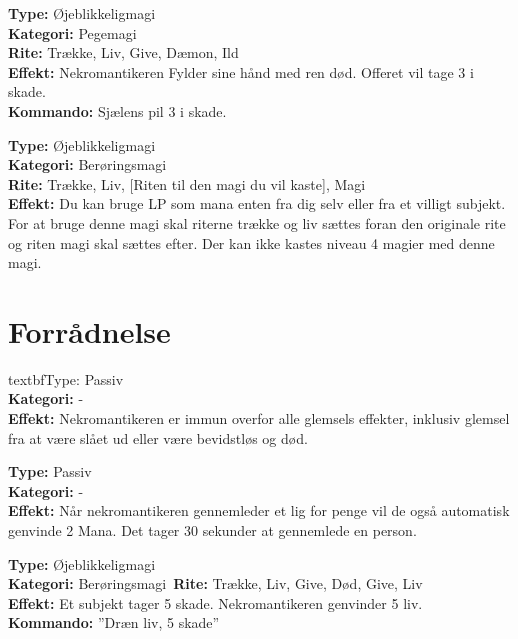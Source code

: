 \begin{nSjæl*}
\textbf{Type:} Øjeblikkeligmagi\\
\textbf{Kategori:} Pegemagi\\
\textbf{Rite:} Trække, Liv, Give, Dæmon, Ild\\
\textbf{Effekt:} Nekromantikeren Fylder sine hånd med ren død. Offeret vil tage 3 i skade.\\
\textbf{Kommando:} Sjælens pil 3 i skade.\\

\end{nSjæl*}

\begin{nSjæl*}
\textbf{Type:} Øjeblikkeligmagi\\
\textbf{Kategori:} Berøringsmagi\\
\textbf{Rite:} Trække, Liv, [Riten til den magi du vil kaste], Magi\\
\textbf{Effekt:} Du kan bruge LP som mana enten fra dig selv eller fra et villigt subjekt. For at bruge denne magi skal riterne trække og liv sættes foran den originale rite og riten magi skal sættes efter. Der kan ikke kastes niveau 4 magier med denne magi.
\end{nSjæl*}

\section*{Forrådnelse}

\begin{død*}
textbf{Type:} Passiv\\
\textbf{Kategori:} -\\
\textbf{Effekt:} Nekromantikeren er immun overfor alle glemsels effekter, inklusiv glemsel fra at være slået ud eller være bevidstløs og død.
\end{død*}

\begin{død*}
\textbf{Type:} Passiv \\
\textbf{Kategori:} -\\
\textbf{Effekt:} Når nekromantikeren gennemleder et lig for penge vil de også automatisk genvinde 2 Mana. Det tager 30 sekunder at gennemlede en person.\\ 
\end{død*}

\begin{død*}
\textbf{Type:} Øjeblikkeligmagi\\
\textbf{Kategori:} Berøringsmagi\
\textbf{Rite:} Trække, Liv, Give, Død, Give, Liv\\
\textbf{Effekt:} Et subjekt tager 5 skade. Nekromantikeren genvinder 5 liv.\\
\textbf{Kommando:} ”Dræn liv, 5 skade”
\end{død*}

